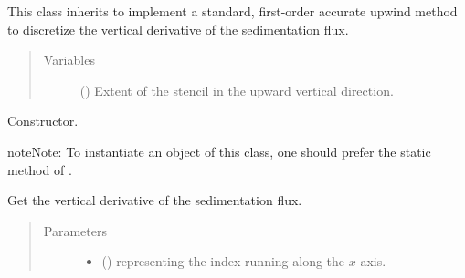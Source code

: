 \documentclass[letterpaper,10pt,english]{sphinxmanual}
\begin{document}

\begin{fulllineitems}
\label{\detokenize{api:dycore.flux_sedimentation.FluxSedimentationUpwindFirstOrder}}
This class inherits  to implement a standard, first-order
accurate upwind method to discretize the vertical derivative of the sedimentation flux.
\begin{quote}\begin{description}
\item[{Variables}] \leavevmode
{\hyperref[\detokenize{api:dycore.prognostic_isentropic.PrognosticIsentropic.nb}]{}} () \textendash{} Extent of the stencil in the upward vertical direction.

\end{description}\end{quote}

\begin{fulllineitems}
\label{\detokenize{api:dycore.flux_sedimentation.FluxSedimentationUpwindFirstOrder.__init__}}
Constructor.

\begin{sphinxadmonition}{note}{Note:}
To instantiate an object of this class, one should prefer the static method
 of
.
\end{sphinxadmonition}

\end{fulllineitems}


\begin{fulllineitems}
\label{\detokenize{api:dycore.flux_sedimentation.FluxSedimentationUpwindFirstOrder.get_vertical_derivative_of_sedimentation_flux}}
Get the vertical derivative of the sedimentation flux.
\begin{quote}\begin{description}
\item[{Parameters}] \leavevmode\begin{itemize}
\item {} 
 () \textendash{}  representing the index running along the \(x\)-axis.


\end{itemize}
\end{description}
\end{quote}
\end{fulllineitems}
\end{fulllineitems}
\end{document}
